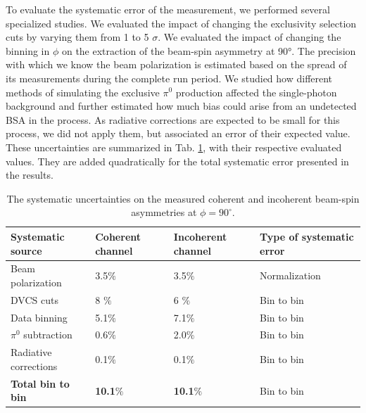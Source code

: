 \documentclass{article}
\begin{document}
To evaluate the systematic error of the measurement, we performed several specialized studies. We 
evaluated the impact of changing the exclusivity selection cuts by varying them from 1 to 5 $\sigma$. 
We evaluated the impact of changing the binning in $\phi$ on the extraction of the beam-spin asymmetry
at 90°. The precision with which we know the beam polarization is estimated based on the spread 
of its measurements during the complete run period. We studied how different methods of
simulating the exclusive $\pi^0$ production affected the single-photon background and
further estimated how much bias could arise from an undetected BSA in the process. As 
radiative corrections are expected to be small
for this process, we did not apply them, but associated an error of their expected value.
These uncertainties are summarized in Tab. \ref{Table:systematic_uncertainties}, with their respective 
evaluated values. They are added quadratically for the total systematic error presented in the results.

\begin{table}[tbp]
\begin{center}
	\begin{tabular}{|m{4cm}|m{2cm}<{\centering}|m{2.3cm}<{\centering}|m{3.7cm}<{\centering}|}
\hline
\bf Systematic source & \bf  Coherent channel  & \bf Incoherent channel & \bf Type of systematic 
error\\
\hline
Beam polarization &  3.5$\%$ &  3.5$\%$& Normalization\\
\hline
\hline
DVCS cuts & 8 $\%$ &  6 $\%$ & Bin to bin\\
\hline
Data binning & 5.1$\%$ & 7.1$\%$ & Bin to bin\\
\hline
$\pi^0$ subtraction &  0.6$\%$ &  2.0$\%$ & Bin to bin\\
\hline
Radiative corrections &  0.1$\%$ & 0.1$\%$ & Bin to bin\\
\hline
\hline
\textbf{Total bin to bin} &  \textbf{10.1}$\%$ &   \textbf{10.1}$\%$ & Bin to 
bin\\
\hline
\end{tabular}
\caption{The systematic uncertainties on the measured coherent and incoherent 
beam-spin asymmetries at $\phi = 90^{\circ}$.}
\label{Table:systematic_uncertainties}
\end{center}
\end{table}
\end{document}
